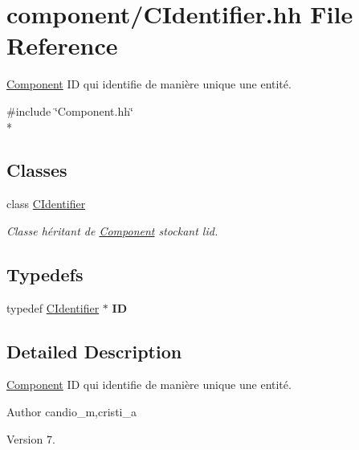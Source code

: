 \hypertarget{_c_identifier_8hh}{}\section{component/\+C\+Identifier.hh File Reference}
\label{_c_identifier_8hh}


\hyperlink{class_component}{Component} I\+D qui identifie de manière unique une entité.  


{\ttfamily \#include \char`\"{}Component.\+hh\char`\"{}}\\*
\subsection*{Classes}
\begin{DoxyCompactItemize}
\item 
class \hyperlink{class_c_identifier}{C\+Identifier}
\begin{DoxyCompactList}\small\item\em Classe héritant de \hyperlink{class_component}{Component} stockant l\textquotesingle{}id. \end{DoxyCompactList}\end{DoxyCompactItemize}
\subsection*{Typedefs}
\begin{DoxyCompactItemize}
\item 
\hypertarget{_c_identifier_8hh_a08f04e00de47176e7dc93fab615cd419}{}typedef \hyperlink{class_c_identifier}{C\+Identifier} $\ast$ {\bfseries I\+D}\label{_c_identifier_8hh_a08f04e00de47176e7dc93fab615cd419}

\end{DoxyCompactItemize}


\subsection{Detailed Description}
\hyperlink{class_component}{Component} I\+D qui identifie de manière unique une entité. 

\begin{DoxyAuthor}{Author}
candio\+\_\+m,cristi\+\_\+a 
\end{DoxyAuthor}
\begin{DoxyVersion}{Version}
7. 
\end{DoxyVersion}
